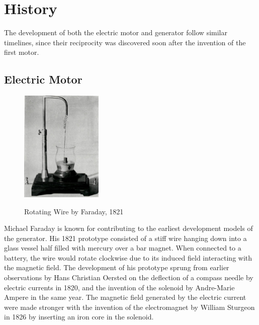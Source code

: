 \section{History}
The development of both the electric motor and generator follow similar timelines, since their reciprocity was discovered soon after the invention of the first motor.

    \subsection{Electric Motor}

    \begin{figure}[!ht]
        \begin{center}
            \includegraphics[width=0.35\textwidth]{figures/history/rotating_wire.jpg}
            \label{fig:faraday}
        \end{center} \caption{Rotating Wire by Faraday, 1821}
    \end{figure}

    \noindent
    Michael Faraday is known for contributing to the earliest development models of the generator. His 1821 prototype consisted of a stiff wire hanging down into a glass vessel half filled with mercury over a bar magnet. When connected to a battery, the wire would rotate clockwise due to its induced field interacting with the magnetic field. \cite{firstmotor} The development of his prototype sprung from earlier observations by Hans Christian Oersted on the deflection of a compass needle by electric currents in 1820, and the invention of the solenoid by Andre-Marie Ampere in the same year. \cite{solenoid_ref} The magnetic field generated by the electric current were made stronger with the invention of the electromagnet by William Sturgeon in 1826 by inserting an iron core in the solenoid. \cite{em_ref} \\

